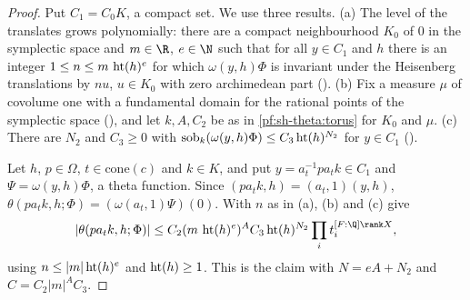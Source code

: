 \begin{proof}
Put $C_1=C_0K$, a compact set. We use three results.
(a) The level of the translates grows polynomially: there are a compact neighbourhood $K_0$ of $0$ in the symplectic space and
$m\in\R$, $e\in\N$ such that for all $y\in C_1$ and $h$ there is an integer $1\le n\le m\,\operatorname{ht}(h)^e$ for which
$\omega(y,h)\Phi$ is invariant under the Heisenberg translations by $nu$, $u\in K_0$ with zero archimedean part
().
(b) Fix a measure $\mu$ of covolume one with a fundamental domain for the rational points of the symplectic space
(), and let $k,A,C_2$ be as in \cref{pf:sh-theta:torus} for $K_0$ and $\mu$.
(c) There are $N_2$ and $C_3\ge0$ with $\mathrm{sob}_k(\omega(y,h)\Phi)\le C_3\operatorname{ht}(h)^{N_2}$ for $y\in C_1$
().

Let $h$, $p\in\Omega$, $t\in\mathrm{cone}(c)$ and $k\in K$, and put $y=a_t^{-1}pa_tk\in C_1$ and $\Psi=\omega(y,h)\Phi$, a theta
function. Since $(pa_tk,h)=(a_t,1)(y,h)$, $\theta(pa_tk,h;\Phi)=(\omega(a_t,1)\Psi)(0)$. With $n$ as in (a), (b) and (c) give
\[
|\theta(pa_tk,h;\Phi)|\le C_2(m\,\shthetaht(h)^e)^AC_3\shthetaht(h)^{N_2}\prod_it_i^{[F:\Q]\rank X},
\]
using $n\le|m|\operatorname{ht}(h)^e$ and $\operatorname{ht}(h)\ge1$. This is the claim with $N=eA+N_2$ and $C=C_2|m|^AC_3$.
\end{proof}

